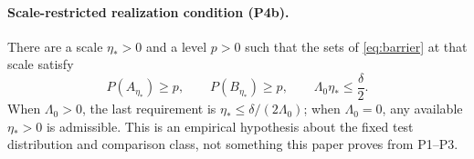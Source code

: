 \documentclass[twoside,11pt]{article}
\begin{document}
\paragraph{Scale-restricted realization condition (P4b).} There are a scale $\eta_*>0$ and a level $p>0$ such that the sets of \eqref{eq:barrier} at that scale satisfy
\begin{equation}
P(A_{\eta_*})\geq p, \qquad P(B_{\eta_*})\geq p, \qquad \Lambda_0\eta_*\leq\frac{\delta}{2}.
\label{eq:realization}%
\end{equation}%
When $\Lambda_0>0$, the last requirement is $\eta_*\leq\delta/(2\Lambda_0)$; when $\Lambda_0=0$, any available $\eta_*>0$ is admissible. This is an empirical hypothesis about the fixed test distribution and comparison class, not something this paper proves from P1--P3.
\end{document}

